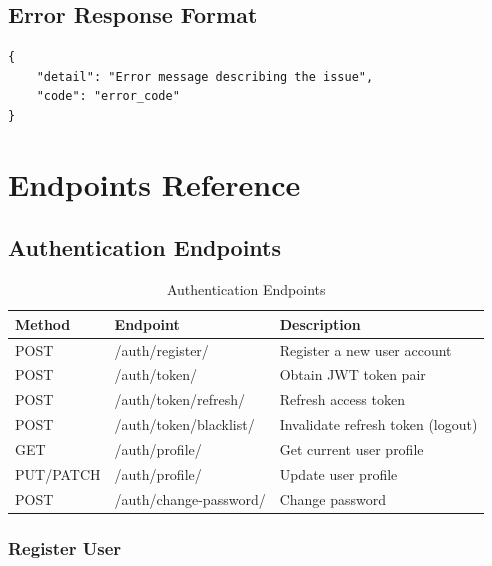 \documentclass[11pt,a4paper]{article}
\begin{document}
\subsection{Error Response Format}

\begin{lstlisting}[style=json]
{
    "detail": "Error message describing the issue",
    "code": "error_code"
}
\end{lstlisting}

\section{Endpoints Reference}

\subsection{Authentication Endpoints}

\begin{table}[H]
\centering
\small
\begin{tabular}{@{}llp{6cm}@{}}
\toprule
\textbf{Method} & \textbf{Endpoint} & \textbf{Description} \\
\midrule
POST & /auth/register/ & Register a new user account \\
POST & /auth/token/ & Obtain JWT token pair \\
POST & /auth/token/refresh/ & Refresh access token \\
POST & /auth/token/blacklist/ & Invalidate refresh token (logout) \\
GET & /auth/profile/ & Get current user profile \\
PUT/PATCH & /auth/profile/ & Update user profile \\
POST & /auth/change-password/ & Change password \\
\bottomrule
\end{tabular}
\caption{Authentication Endpoints}
\end{table}

\subsubsection{Register User}
\end{document}
